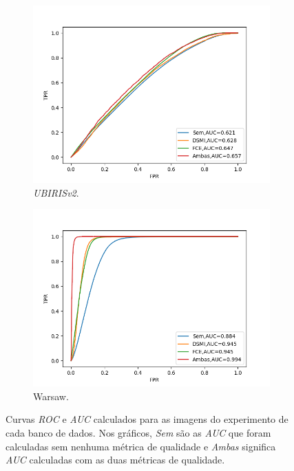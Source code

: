 \begin{figure}[H]
\medskip
\begin{subfigure}{0.5\textwidth}
  \includegraphics[width=\linewidth]{img/Resultados/ubirisv2_inter_distortion_auc.png}
  \caption{\textit{UBIRISv2}.}
\end{subfigure}\hfil %
\begin{subfigure}{0.5\textwidth}
  \includegraphics[width=\linewidth]{img/Resultados/warsaw_inter_distortion_auc.png}
  \caption{{\acrshort{Warsaw}}.}
\end{subfigure}\hfil %
\caption{Curvas \textit{\acrshort{ROC}} e \textit{\acrshort{AUC}} calculados para as imagens do experimento de cada banco de dados. Nos gráficos, \textit{Sem} são as \textit{\acrshort{AUC}} que foram calculadas sem nenhuma métrica de qualidade e \textit{Ambas} significa \textit{\acrshort{AUC}} calculadas com as duas métricas de qualidade.}
\label{fig:experimentos:roc_comruidos}
\end{figure}

